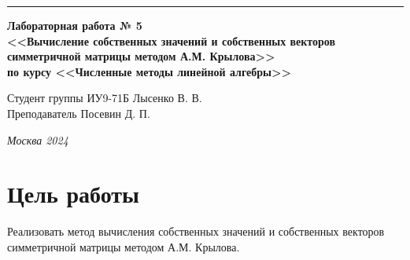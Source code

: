 \documentclass[a4paper, 14pt]{extarticle}
\begin{document}
\begin{titlepage}
\vspace*{-16pt}
\hspace{30pt}\rule{0.866\textwidth}{0.4pt}
  
\vspace{11em}

\begin{center}
\Large {\bf Лабораторная работа № 5} \\ 
\large {\bf<<Вычисление собственных значений и собственных векторов симметричной матрицы методом А.М. Крылова>>} \\ 
\large {\bf по курсу <<Численные методы линейной алгебры>>} \\ 
\end{center}\normalsize

\vspace{8em}


\begin{flushright}
  {Студент группы ИУ9-71Б Лысенко В. В.\hspace*{15pt} \\
  \vspace{2ex}
  Преподаватель Посевин Д. П.\hspace*{15pt}}
\end{flushright}

\bigskip

\vfill
 

\begin{center}
\textsl{Москва 2024}
\end{center}
\end{titlepage}

\renewcommand{\ttdefault}{pcr}

\setlength{\tabcolsep}{3pt}
\newpage
\setcounter{page}{2}

\section{Цель работы}\label{Sect::task}
\par
\renewcommand{\labelenumii}{\arabic{enumi}.\arabic{enumii}.}
Реализовать метод вычисления собственных значений и собственных векторов симметричной матрицы методом А.М. Крылова.
\end{document}
